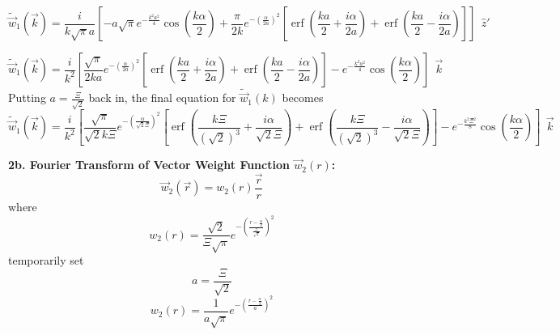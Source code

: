 \documentclass[12pt]{article}
\begin{document}
\begin{equation}{\widetilde{\vec{w}}_1(\vec{k})=\frac{i}{k\sqrt{\pi}a}\left[-a\sqrt{\pi}e^{-\frac{k^2a^2}{4}}\cos\left(\frac{k\alpha}{2}\right)+\frac{\pi}{2k}e^{-\left(\frac{\alpha}{2a}\right)^2}\left[\operatorname{erf}\left(\frac{ka}{2}+\frac{i\alpha}{2a}\right)+\operatorname{erf}\left(\frac{ka}{2}-\frac{i\alpha}{2a}\right)\right]\right]{~~}\hat{z}'}\end{equation}

\begin{equation}{\widetilde{\vec{w}}_1(\vec{k})=\frac{i}{k^2}\left[\frac{\sqrt{\pi}}{2ka}e^{-\left(\frac{\alpha}{2a}\right)^2}\left[\operatorname{erf}\left(\frac{ka}{2}+\frac{i\alpha}{2a}\right)+\operatorname{erf}\left(\frac{ka}{2}-\frac{i\alpha}{2a}\right)\right]-e^{-\frac{k^2a^2}{4}}\cos\left(\frac{k\alpha}{2}\right)\right]{~~}\vec{k}}\end{equation}
Putting $a=\frac{\Xi}{\sqrt{2}}$ back in, the final equation for $\widetilde{\vec{w}}_1(k)$ becomes
\begin{equation}{\widetilde{\vec{w}}_1(\vec{k})=\frac{i}{k^2}\left[\frac{\sqrt{\pi}}{\sqrt{2}k\Xi}e^{-\left(\frac{\alpha}{\sqrt{2}\Xi}\right)^2}\left[\operatorname{erf}\left(\frac{k\Xi}{(\sqrt{2})^3}+\frac{i\alpha}{\sqrt{2}\Xi}\right)+\operatorname{erf}\left(\frac{k\Xi}{(\sqrt{2})^3}-\frac{i\alpha}{\sqrt{2}\Xi}\right)\right]-e^{-\frac{k^2\Xi^2}{8}}\cos\left(\frac{k\alpha}{2}\right)\right]{~~}\vec{k}}\end{equation}

\[{}\]
\textbf{2b. Fourier Transform of Vector Weight Function $\vec{w}_{2}(r)$:}
\begin{equation}{\vec{w}_2(\vec{r})=w_2(r)\frac{\vec{r}}{r}}\end{equation}
where
\begin{equation}{w_2(r)=\frac{\sqrt{2}}{\Xi\sqrt{\pi}}e^{-\left(\frac{r-\frac{\alpha}{2}}{\frac{\Xi}{\sqrt{2}}}\right)^2}}\end{equation}
temporarily set 
\begin{equation}{a=\frac{\Xi}{\sqrt{2}}}\end{equation}
\begin{equation}{w_2(r)=\frac{1}{a\sqrt{\pi}}e^{-\left(\frac{r-\frac{\alpha}{2}}{a}\right)^2}}\end{equation}
\end{document}
